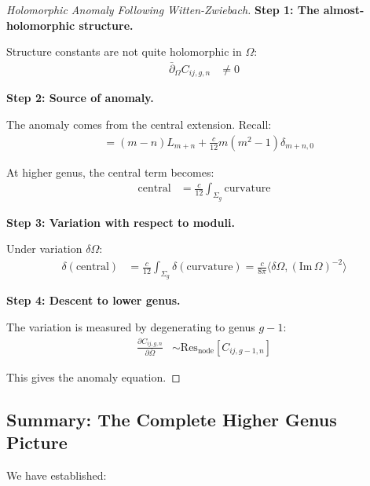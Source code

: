 \begin{proof}[Holomorphic Anomaly Following Witten-Zwiebach]
\textbf{Step 1: The almost-holomorphic structure.}

Structure constants are not quite holomorphic in $\Omega$:
\begin{align}
\bar{\partial}_{\Omega} C_{ij,g,n} &\neq 0
\end{align}

\textbf{Step 2: Source of anomaly.}

The anomaly comes from the central extension. Recall:
\begin{align}
[L_m, L_n] &= (m-n)L_{m+n} + \frac{c}{12}m(m^2-1)\delta_{m+n,0}
\end{align}

At higher genus, the central term becomes:
\begin{align}
\text{central} &= \frac{c}{12}\int_{\Sigma_g} \text{curvature}
\end{align}

\textbf{Step 3: Variation with respect to moduli.}

Under variation $\delta\Omega$:
\begin{align}
\delta(\text{central}) &= \frac{c}{12} \int_{\Sigma_g} \delta(\text{curvature}) = \frac{c}{8\pi} \langle \delta\Omega, (\text{Im}\,\Omega)^{-2} \rangle
\end{align}

\textbf{Step 4: Descent to lower genus.}

The variation is measured by degenerating to genus $g-1$:
\begin{align}
\frac{\partial C_{ij,g,n}}{\partial \bar{\Omega}} &\sim \text{Res}_{\text{node}} [C_{ij,g-1,n}]
\end{align}

This gives the anomaly equation.
\end{proof}

\subsection{Summary: The Complete Higher Genus Picture}

We have established:

